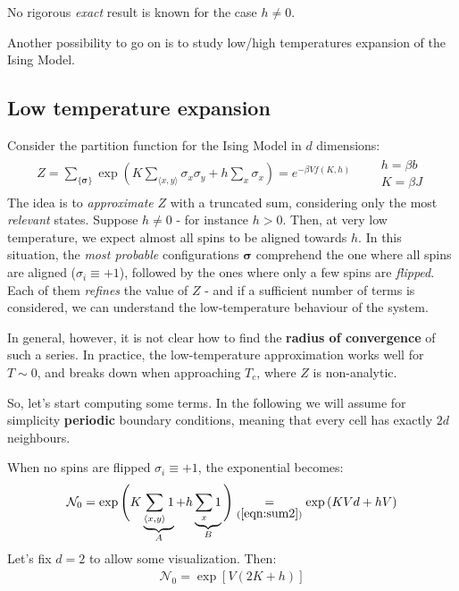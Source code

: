 \documentclass[../template.tex]{subfiles}
\begin{document}
\medskip

No rigorous \textit{exact} result is known for the case $h \neq 0$. 

\medskip

Another possibility to go on is to study low/high temperatures expansion of the Ising Model. 



\subsection{Low temperature expansion}
Consider the partition function for the Ising Model in $d$ dimensions:
\begin{align}\label{eqn:Z-again}
    Z= \sum_{\{\bm{\sigma}\}} \exp\left(K \sum_{\langle x,y \rangle} \sigma_x \sigma_y + h \sum_x \sigma_x\right) = e^{-\beta V f(K,h)} \qquad \substack{h = \beta b\\K = \beta J}
\end{align}
The idea is to \textit{approximate} $Z$ with a truncated sum, considering only the most \textit{relevant} states. Suppose $h\neq 0$ - for instance $h > 0$. Then, at very low temperature, we expect almost all spins to be aligned towards $h$. In this situation, the \textit{most probable} configurations $\bm{\sigma}$ comprehend the one where all spins are aligned ($\sigma_i \equiv +1$), followed by the ones where only a few spins are \textit{flipped}. Each of them \textit{refines} the value of $Z$ - and if a sufficient number of terms is considered, we can understand the low-temperature behaviour of the system.

\medskip

In general, however, it is not clear how to find the \textbf{radius of convergence} of such a series. In practice, the low-temperature approximation works well for $T \sim 0$, and breaks down when approaching $T_c$, where $Z$ is non-analytic.  

\medskip

So, let's start computing some terms. In the following we will assume for simplicity \textbf{periodic} boundary conditions, meaning that every cell has exactly $2d$ neighbours.


When no spins are flipped $\sigma_i \equiv +1$, the exponential becomes:
\begin{align}\label{eqn:term1}
    \mathcal{N}_0 =\exp\Bigg(K \underbrace{\sum_{\langle x,y \rangle} 1 }_{A}+ h \underbrace{\sum_x 1}_{B}\Bigg) \underset{(\ref{eqn:sum2})}{=}  \exp\left(K V d + h V\right)
\end{align}  
Let's fix $d=2$ to allow some visualization. Then:
\begin{align}\label{eqn:term0}
    \mathcal{N}_0 = \exp[V(2K + h)]
\end{align}
\end{document}
